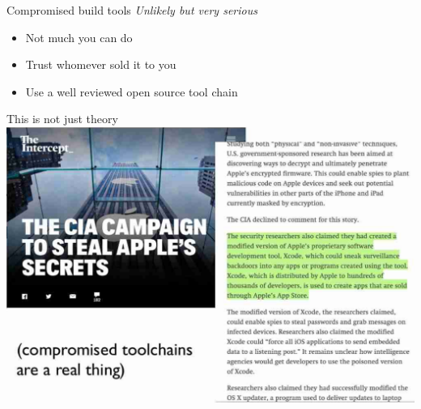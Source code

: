 \documentclass[11pt]{beamer}
\begin{document}
\begin{frame}{Compromised build tools}
\emph{Unlikely but very serious}
\\[0.2cm]
\begin{itemize}
\item Not much you can do
\item Trust whomever sold it to you
\item Use a well reviewed open source tool chain
\end{itemize}
\end{frame}

\begin{frame}{This is not just theory}
\includegraphics[scale=0.23]{apple_toolchain.png}
\end{frame}
\end{document}
